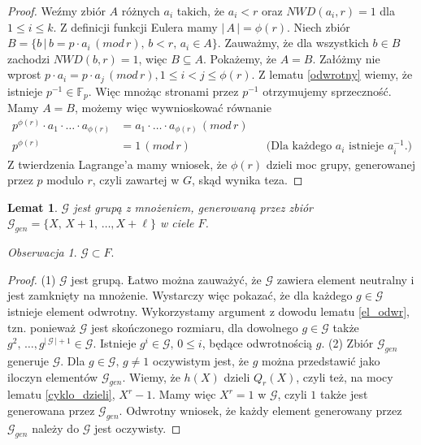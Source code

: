\documentclass[declaration,shortabstract]{iithesis}
\theoremstyle{definition}
\theoremstyle{remark} \newtheorem{observation}{Obserwacja}
\theoremstyle{plain} \newtheorem{theorem}{Twierdzenie}
\theoremstyle{plain} \newtheorem{lemma}{Lemat}
\theoremstyle{remark} \newtheorem*{remark*}{Uwaga}
\theoremstyle{reminder} \newtheorem*{reminder*}{Przypomnienie}
\begin{document}
\begin{proof}
	Weźmy zbiór $A$ różnych $a_i$ takich, że $a_i < r$ oraz $NWD(a_i, r) = 1$ dla ${1 \leq i \leq k}$. Z definicji funkcji Eulera mamy $| \, A \, | = \phi(r)$. Niech zbiór $B = \{b \, | \, b = p \cdot a_i \, (mod \, r), \, b < r, \, a_i \in A\}$. Zauważmy, że dla wszystkich $b \in B$ zachodzi $NWD(b, r) = 1$, więc $B \subseteq A.$ Pokażemy, że $A = B$. Załóżmy nie wprost $p \cdot a_i = p \cdot a_j \, (mod \, r), 1 \leq i < j \leq \phi(r)$. Z lematu \ref{odwrotny} wiemy, że istnieje $p^{-1} \in \mathbb{F}_p$. Więc mnożąc stronami przez $p^{-1}$ otrzymujemy sprzeczność. \newline
	Mamy $A = B$, możemy więc wywnioskować równanie 
	\begin{align*}
		p^{\phi(r)} \cdot a_1 \cdot \dots \cdot a_{\phi(r)} &= a_1 \cdot \dots \cdot a_{\phi(r)} \, (mod \, r) \\
		p^{\phi(r)} & = 1 \, (mod \, r) &   & \text{(Dla każdego $a_i$ istnieje $a_i^{-1}$.)} 
	\end{align*}
	Z twierdzenia Lagrange'a mamy wniosek, że $\phi(r)$ dzieli moc grupy, generowanej przez $p$ modulo $r$, czyli zawartej w $G$, skąd wynika teza.
					
\end{proof}
	
\begin{lemma}
	$\mathcal{G}$ jest grupą z mnożeniem, generowaną przez zbiór $\mathcal{G}_{gen} = \{X, \, X + 1, \, \dots, X + \ell\}$ w ciele $F$.
\end{lemma}
	
\begin{observation}
	$\mathcal{G} \subset F$.
\end{observation}
	
\begin{proof}
	(1) $\mathcal{G}$ jest grupą. Łatwo można zauważyć, że $\mathcal{G}$ zawiera element neutralny i jest zamknięty na mnożenie. Wystarczy więc pokazać, że dla każdego $g \in \mathcal{G}$ istnieje element odwrotny. Wykorzystamy argument z dowodu lematu \ref{el_odwr}, tzn. ponieważ $\mathcal{G}$ jest skończonego rozmiaru, dla dowolnego $g \in \mathcal{G}$ także $g^2, \, \dots, g^{| \,  \mathcal{G}\, | + 1}\in \mathcal{G}$. Istnieje $g^i \in \mathcal{G}, \,0 \leq i$, będące odwrotnością $g$.\newline
	(2) Zbiór $\mathcal{G}_{gen}$ generuje $\mathcal{G}$. Dla $g \in \mathcal{G}, \, g \neq 1$ oczywistym jest, że $g$ można przedstawić jako iloczyn elementów $\mathcal{G}_{gen}$. Wiemy, że $h(X)$ dzieli $Q_r(X)$, czyli też, na mocy lematu \ref{cyklo_dzieli}, $X^r - 1$. Mamy więc $X^r = 1$ w $\mathcal{G}$, czyli $1$ także jest generowana przez $\mathcal{G}_{gen}$. Odwrotny wniosek, że każdy element generowany przez $\mathcal{G}_{gen}$ należy do $\mathcal{G}$ jest oczywisty.
\end{proof}
	
\end{document}
